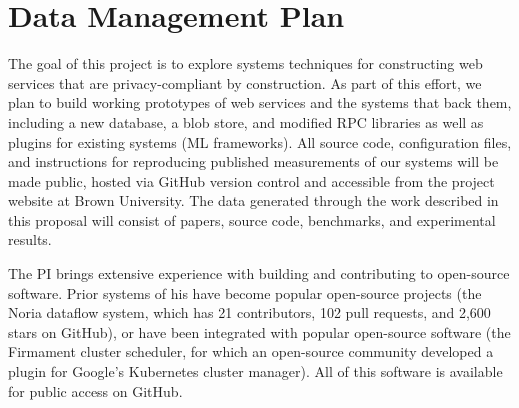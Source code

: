 \section*{Data Management Plan}

%
%
%
%
%


%
The goal of this project is to explore systems techniques for constructing web
services that are privacy-compliant by construction.
%
As part of this effort, we plan to build working prototypes of web services and
the systems that back them, including a new database, a blob store, and modified
RPC libraries as well as plugins for existing systems (\eg ML frameworks).
%
All source code, configuration files, and instructions for reproducing published
measurements of our systems will be made public, hosted via GitHub version
control and accessible from the project website at Brown University.
%
The data generated through the work described in this proposal will consist of
papers, source code,  benchmarks, and experimental results.
%

%
The PI brings extensive experience with building and contributing to open-source
software.
%
Prior systems of his have become popular open-source projects (\eg the Noria
dataflow system, which has 21 contributors, 102 pull requests, and 2,600 stars
on GitHub), or have been integrated with popular open-source software (\eg the
Firmament cluster scheduler, for which an open-source community developed a
plugin for Google's Kubernetes cluster manager).
%
All of this software is available for public access on GitHub.
%

